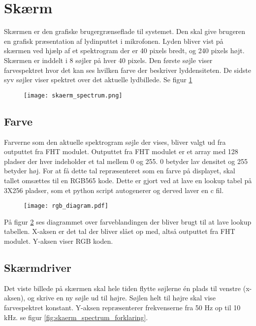%

%

\section{Skærm}
Skærmen er den grafiske brugergrænseflade til systemet. Den skal give brugeren en grafisk præsentation af lydinputtet i mikrofonen. Lyden bliver vist på skærmen ved hjælp af et spektrogram der er 40 pixels bredt, og 240 pixels højt.
Skærmen er inddelt i 8 søjler på hver 40 pixels. Den første søjle viser farvespektret hvor det kan ses hvilken farve der beskriver lyddensiteten. De sidste syv søjler viser spektret over det aktuelle lydbillede. Se figur \ref{fig:skaerm_spectrum}

\begin{figure} [H]
	\centering
	\texttt{[image: skaerm\_spectrum.png]}
	\label{fig:skaerm_spectrum}
\end{figure}

\subsection{Farve}
Farverne som den aktuelle spektrogram søjle der vises, bliver valgt ud fra outputtet fra FHT modulet. Outputtet fra FHT modulet er et array med 128 pladser der hver indeholder et tal mellem 0 og 255. 0 betyder lav densitet og 255 betyder høj.
For at få dette tal repræsenteret som en farve på displayet, skal tallet omsættes til en RGB565 kode.
Dette er gjort ved at lave en lookup tabel på 3X256 pladser, som et python script autogenerer og derved laver en c fil.

\begin{figure} [H]
	\centering
	\texttt{[image: rgb\_diagram.pdf]}
	\label{fig:rgb_diagram}
\end{figure}


På figur \ref{fig:rgb_diagram} ses diagrammet over farveblandingen der bliver brugt til at lave lookup tabellen. X-aksen er det tal der bliver slået op med, altså outputtet fra FHT modulet. Y-aksen viser RGB koden.


\subsection{Skærmdriver}
Det viste billede på skærmen skal hele tiden flytte søjlerne én plads til venstre (x-aksen), og skrive en ny søjle ud til højre. Søjlen helt til højre skal vise farvespektret konstant.
Y-aksen repræsenterer frekvenserne fra 50 Hz op til 10 kHz. se figur \ref{fig:skaerm_spectrum_forklaring}.

